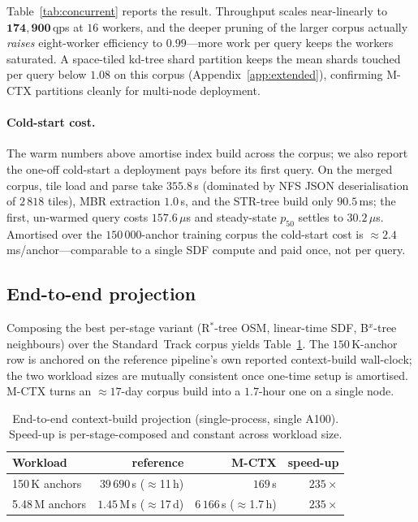 Table~\ref{tab:concurrent} reports the result. Throughput scales
near-linearly to $\mathbf{174{,}900}$\,qps at $16$ workers, and the deeper
pruning of the larger corpus actually \emph{raises} eight-worker
efficiency to $0.99$---more work per query keeps the workers saturated. A
space-tiled kd-tree shard partition keeps the mean shards touched per
query below $1.08$ on this corpus (Appendix~\ref{app:extended}),
confirming M-CTX partitions cleanly for multi-node deployment.

\paragraph*{Cold-start cost.}
The warm numbers above amortise index build across the corpus; we also
report the one-off cold-start a deployment pays before its first query. On
the merged corpus, tile load and parse take $355.8$\,s (dominated by NFS
JSON deserialisation of $2\,818$ tiles), MBR extraction $1.0$\,s, and the
STR-tree build only $90.5$\,ms; the first, un-warmed query costs
$157.6$\,$\mu$s and steady-state $p_{50}$ settles to $30.2$\,$\mu$s.
Amortised over the $150\,000$-anchor training corpus the cold-start cost is
$\approx\!2.4$\,ms/anchor---comparable to a single SDF compute and paid
once, not per query.

\subsection{End-to-end projection}\label{ssec:e2e}
Composing the best per-stage variant (R$^{*}$-tree OSM, linear-time SDF,
B$^{x}$-tree neighbours) over the Standard~Track corpus yields
Table~\ref{tab:e2e}. The $150$\,K-anchor row is anchored on the reference
pipeline's own reported context-build wall-clock; the two workload sizes
are mutually consistent once one-time setup is amortised. M-CTX turns an
$\approx\!17$-day corpus build into a $1.7$-hour one on a single node.

\begin{table}[t]
\centering
\caption{End-to-end context-build projection (single-process, single
A100). Speed-up is per-stage-composed and constant across workload
size.}\label{tab:e2e}
\small
\begin{tabular}{lrrr}
\toprule
Workload & reference & M-CTX & speed-up \\
\midrule
150\,K anchors  & $39\,690$\,s ($\approx$11\,h)  & $169$\,s & $235\times$ \\
5.48\,M anchors & $1.45$\,M\,s ($\approx$17\,d) & $6\,166$\,s ($\approx$1.7\,h) & $235\times$ \\
\bottomrule
\end{tabular}
\end{table}

